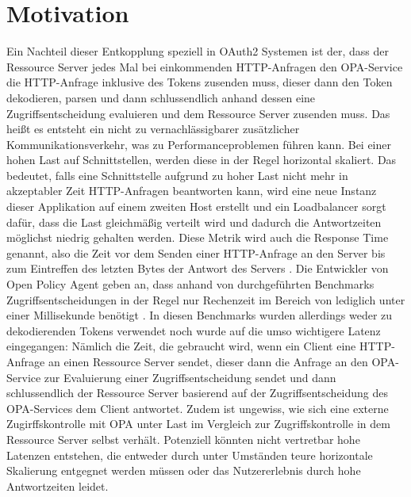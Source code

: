 \section{Motivation}
\label{sec:intro:motivation}
Ein Nachteil dieser Entkopplung speziell in OAuth2 Systemen ist der, dass der Ressource Server jedes Mal bei einkommenden HTTP-Anfragen den OPA-Service die HTTP-Anfrage inklusive des Tokens zusenden muss, dieser dann den Token dekodieren, parsen und dann schlussendlich anhand dessen eine Zugriffsentscheidung evaluieren und dem Ressource Server zusenden muss. Das heißt es entsteht ein nicht zu vernachlässigbarer zusätzlicher Kommunikationsverkehr, was zu Performanceproblemen führen kann. Bei einer hohen Last auf Schnittstellen, werden diese in der Regel horizontal skaliert. Das bedeutet, falls eine Schnittstelle aufgrund zu hoher Last nicht mehr in akzeptabler Zeit HTTP-Anfragen beantworten kann, wird eine neue Instanz dieser Applikation auf einem zweiten Host erstellt und ein Loadbalancer sorgt dafür, dass die Last gleichmäßig verteilt wird und dadurch die Antwortzeiten möglichst niedrig gehalten werden. Diese Metrik wird auch die Response Time genannt, also die Zeit vor dem Senden einer HTTP-Anfrage an den Server bis zum Eintreffen des letzten Bytes der Antwort des Servers \citep{jmeterglossary:2021}. 
Die Entwickler von Open Policy Agent geben an, dass anhand von durchgeführten Benchmarks Zugriffsentscheidungen in der Regel nur Rechenzeit im Bereich von lediglich unter einer Millisekunde benötigt \citep{opaperformance:2021:07}. In diesen Benchmarks wurden allerdings weder zu dekodierenden Tokens verwendet noch wurde auf die umso wichtigere Latenz eingegangen: Nämlich die Zeit, die gebraucht wird, wenn ein Client eine HTTP-Anfrage an einen Ressource Server sendet, dieser dann die Anfrage an den OPA-Service zur Evaluierung einer Zugriffsentscheidung sendet und dann schlussendlich der Ressource Server basierend auf der Zugriffsentscheidung des OPA-Services dem Client antwortet. Zudem ist ungewiss, wie sich eine externe Zugirffskontrolle mit OPA unter Last im Vergleich zur Zugriffskontrolle in dem Ressource Server selbst verhält. Potenziell könnten nicht vertretbar hohe Latenzen entstehen, die entweder durch unter Umständen teure horizontale Skalierung entgegnet werden müssen oder das Nutzererlebnis durch hohe Antwortzeiten leidet.

%
%
